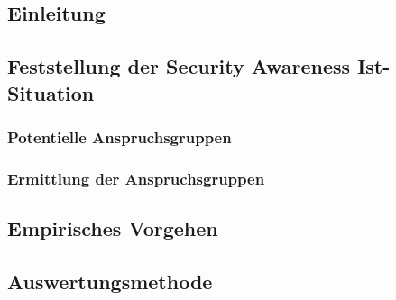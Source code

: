 \documentclass[../../main.tex]{subfiles}
\begin{document}
\subsection{Einleitung}


\subsection{Feststellung der Security Awareness Ist-Situation}


\subsubsection{Potentielle Anspruchsgruppen}


\subsubsection{Ermittlung der Anspruchsgruppen}


\subsection{Empirisches Vorgehen}


\subsection{Auswertungsmethode}
\label{Auswertungsmethode}

\end{document}
